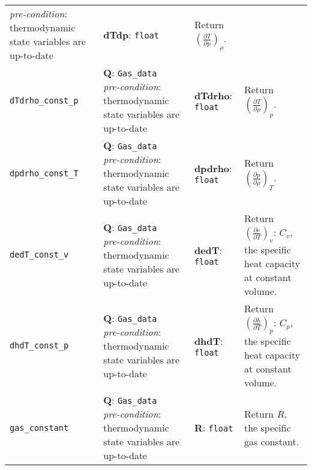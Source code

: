 \begin{landscape}
\begin{center}
\begin{longtable}{p{5.5cm}p{4.5cm}p{4.5cm}p{6.5cm}}
{                                                  \textit{pre-condition}: thermodynamic state variables are up-to-date}
                                   & \raggedright{\textbf{dTdp}: \texttt{float}}
                                   & Return $\left(\frac{\partial T}{\partial p}\right)_{\rho}$. \\
\texttt{dTdrho\_const\_p}          & \raggedright{\textbf{Q}: \texttt{Gas\_data} \\
                                                  \textit{pre-condition}: thermodynamic state variables are up-to-date}
                                   & \raggedright{\textbf{dTdrho}: \texttt{float}}
                                   & Return $\left(\frac{\partial T}{\partial \rho}\right)_{p}$. \\
\texttt{dpdrho\_const\_T}          & \raggedright{\textbf{Q}: \texttt{Gas\_data} \\
                                                  \textit{pre-condition}: thermodynamic state variables are up-to-date}
                                   & \raggedright{\textbf{dpdrho}: \texttt{float}}
                                   & Return $\left(\frac{\partial p}{\partial \rho}\right)_{T}$. \\
\texttt{dedT\_const\_v}            & \raggedright{\textbf{Q}: \texttt{Gas\_data} \\
                                                  \textit{pre-condition}: thermodynamic state variables are up-to-date}
                                   & \raggedright{\textbf{dedT}: \texttt{float}}
                                   & Return $\left(\frac{\partial e}{\partial T}\right)_{v}$: $C_v$, the specific
                                     heat capacity at constant volume. \\
\texttt{dhdT\_const\_p}            & \raggedright{\textbf{Q}: \texttt{Gas\_data} \\
                                                  \textit{pre-condition}: thermodynamic state variables are up-to-date}
                                   & \raggedright{\textbf{dhdT}: \texttt{float}}
                                   & Return $\left(\frac{\partial h}{\partial T}\right)_{p}$: $C_p$, the specific
                                     heat capacity at constant volume. \\
\texttt{gas\_constant}             & \raggedright{\textbf{Q}: \texttt{Gas\_data} \\
                                                  \textit{pre-condition}: thermodynamic state variables are up-to-date}
                                   & \raggedright{\textbf{R}: \texttt{float}}
                                   & Return $R$, the specific gas constant. \\
\end{longtable}
\end{center}
\end{landscape}

